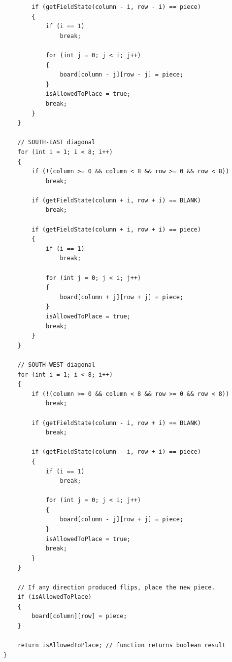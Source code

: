 \documentclass[11pt]{article}
\begin{document}
\begin{lstlisting}
        if (getFieldState(column - i, row - i) == piece)
        {
            if (i == 1)
                break;

            for (int j = 0; j < i; j++)
            {
                board[column - j][row - j] = piece;
            }
            isAllowedToPlace = true;
            break;
        }
    }

    // SOUTH-EAST diagonal
    for (int i = 1; i < 8; i++)
    {
        if (!(column >= 0 && column < 8 && row >= 0 && row < 8))
            break;

        if (getFieldState(column + i, row + i) == BLANK)
            break;

        if (getFieldState(column + i, row + i) == piece)
        {
            if (i == 1)
                break;

            for (int j = 0; j < i; j++)
            {
                board[column + j][row + j] = piece;
            }
            isAllowedToPlace = true;
            break;
        }
    }

    // SOUTH-WEST diagonal
    for (int i = 1; i < 8; i++)
    {
        if (!(column >= 0 && column < 8 && row >= 0 && row < 8))
            break;

        if (getFieldState(column - i, row + i) == BLANK)
            break;

        if (getFieldState(column - i, row + i) == piece)
        {
            if (i == 1)
                break;

            for (int j = 0; j < i; j++)
            {
                board[column - j][row + j] = piece;
            }
            isAllowedToPlace = true;
            break;
        }
    }

    // If any direction produced flips, place the new piece.
    if (isAllowedToPlace)
    {
        board[column][row] = piece;
    }

    return isAllowedToPlace; // function returns boolean result
}
\end{lstlisting}
\end{document}
